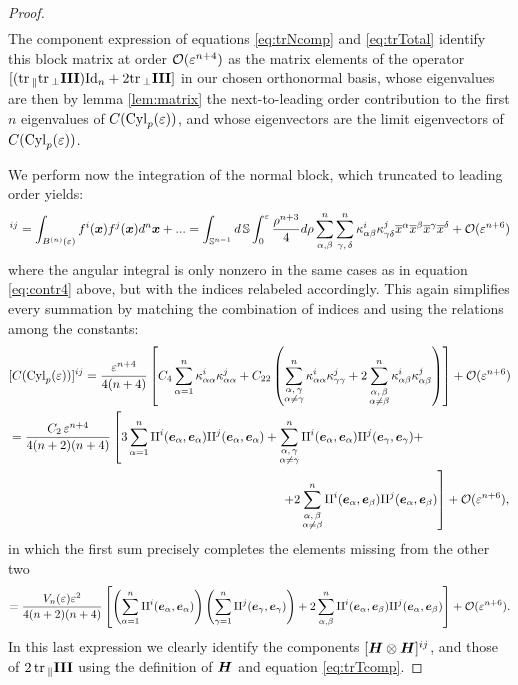 \documentclass[letterpaper, reqno, 11pt]{amsart}
\theoremstyle{definition}
\theoremstyle{remark}
\numberwithin{equation}{section}
\begin{document}
\begin{proof}
\begin{align*}
\end{align*}
The component expression of equations \ref{eq:trNcomp} and \ref{eq:trTotal} identify this block matrix at order ${\mathcal O}(\varepsilon^{n+4})$ as the matrix elements of the operator $[(\mathrm{tr}\,_\parallel\mathrm{tr}\,_\perp\boldsymbol{\mathrm{III}})\mathrm{Id}_n + 2\mathrm{tr}\,_\perp\boldsymbol{\mathrm{III}}]$ in our chosen orthonormal basis, whose eigenvalues are then by lemma \ref{lem:matrix} the next-to-leading order contribution to the first $n$ eigenvalues of $C(\mathrm{Cyl}_p(\varepsilon))$, and whose eigenvectors are the limit eigenvectors of $C(\mathrm{Cyl}_p(\varepsilon))$.

We perform now the integration of the normal block, which truncated to leading order yields:
\begin{align*}
[C(\Cyll(\vep))]^{ij} =\int_{B^{(n)}(\vep)}f^i(\bx)f^j(\bx) d^n\bx +... =  \int_{\SS^{n-1}}d\,\SS\int^\vep_0 \frac{\rho^{n+3}}{4}d\rho\sum^n_{\al,\bet}\sum^n_{\ga,\,\del}\ka^i_{\al\bet}\ka^j_{\ga\del}\cx^\al\cx^\bet\cx^\ga\cx^\del + \cO(\vep^{n+6})
\end{align*}
where the angular integral is only nonzero in the same cases as in equation \ref{eq:contr4} above, but with the indices relabeled accordingly. This again simplifies every summation by matching the combination of indices and using the relations among the constants:
\begin{align*}
& [C(\mathrm{Cyl}_p(\varepsilon))]^{ij} = \frac{\varepsilon^{n+4}}{4(n+4)}\left[ C_4\sum_{\alpha=1}^n\kappa^i_{\alpha\alpha}\kappa^j_{\alpha\alpha} +C_{22}\left( \sum^n_{\substack{\alpha,\,\gamma \\ \alpha\neq\gamma}}\kappa^i_{\alpha\alpha}\kappa^j_{\gamma\gamma} + 2\sum^n_{\substack{\alpha,\,\beta \\ \alpha\neq\beta}}\kappa^i_{\alpha\beta}\kappa^j_{\alpha\beta} \right)\right] + {\mathcal O}(\varepsilon^{n+6}) \\
& = \frac{C_2\,\varepsilon^{n+4}}{4(n+2)(n+4)}\left[ 3\sum_{\alpha=1}^n \mathrm{II}^i(\boldsymbol{e}_\alpha,\boldsymbol{e}_\alpha)\mathrm{II}^j(\boldsymbol{e}_\alpha,\boldsymbol{e}_\alpha) + \sum^n_{\substack{\alpha,\,\gamma \\ \alpha\neq\gamma}}\mathrm{II}^i(\boldsymbol{e}_\alpha,\boldsymbol{e}_\alpha)\mathrm{II}^j(\boldsymbol{e}_\gamma,\boldsymbol{e}_\gamma) +\right. \\ 
& \qquad\qquad\qquad\qquad\qquad\qquad\qquad\qquad\qquad\qquad\qquad \left. + 2\sum^n_{\substack{\alpha,\,\beta \\ \alpha\neq\beta}}\mathrm{II}^i(\boldsymbol{e}_\alpha,\boldsymbol{e}_\beta)\mathrm{II}^j(\boldsymbol{e}_\alpha,\boldsymbol{e}_\beta)  \right] + {\mathcal O}(\varepsilon^{n+6}),
\end{align*}
in which the first sum precisely completes the elements missing from the other two
$$
= \frac{V_n(\varepsilon)\varepsilon^2}{4(n+2)(n+4)}\left[ \left(\sum_{\alpha=1}^n\mathrm{II}^i(\boldsymbol{e}_\alpha,\boldsymbol{e}_\alpha)\right)\left(\sum_{\gamma=1}^n\mathrm{II}^j(\boldsymbol{e}_\gamma,\boldsymbol{e}_\gamma)\right) + 2\sum_{\alpha,\beta}^n\mathrm{II}^i(\boldsymbol{e}_\alpha,\boldsymbol{e}_\beta)\mathrm{II}^j(\boldsymbol{e}_\alpha,\boldsymbol{e}_\beta) \right] + {\mathcal O}(\varepsilon^{n+6}).
$$
In this last expression we clearly identify the components $[\boldsymbol{H}\otimes\boldsymbol{H}]^{ij}$, and those of $2\,\mathrm{tr}\,_\parallel\boldsymbol{\mathrm{III}}$ using the definition of $\boldsymbol{H}$ and equation \ref{eq:trTcomp}.
\end{proof}
\end{document}

